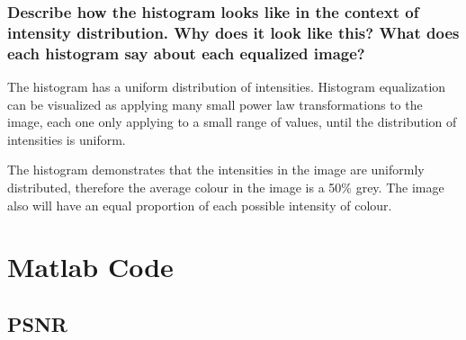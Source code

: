 \documentclass[article, 1.5space, letterpaper, 12pt, oneside, header, footer]{SydeClass}
\begin{document}
\subsubsection{Describe how the histogram looks like in the context of intensity distribution. Why does it look like this? What does each histogram say about each equalized image?}

The histogram has a uniform distribution of intensities. Histogram equalization can be visualized as applying many small power law transformations to the image, each one only applying to a small range of values, until the distribution of intensities is uniform. 

The histogram demonstrates that the intensities in the image are uniformly distributed, therefore the average colour in the image is a 50\% grey. The image also will have an equal proportion of each possible intensity of colour.

\appendix
\newpage

\section{Matlab Code}
\subsection{PSNR}
\label{code-PSNR}




\end{document}
